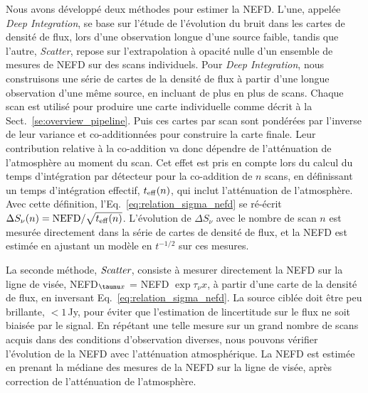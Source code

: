 Nous avons développé deux méthodes pour estimer la NEFD. L'une,
appelée \emph{Deep Integration}, se base sur l'étude de l'évolution du
bruit dans les cartes de densité de flux, lors d'une observation
longue d'une source faible, tandis que l'autre, \emph{Scatter}, repose
sur l'extrapolation à opacité nulle d'un ensemble de mesures de NEFD
sur des scans individuels.
Pour \emph{Deep Integration}, nous construisons une série de cartes de
la densité de flux à partir d'une longue observation d'une même source, en
incluant de plus en plus de scans. Chaque scan est utilisé pour
produire une carte individuelle comme décrit à la
Sect.~\ref{se:overview_pipeline}. Puis ces cartes par scan sont
pondérées par l'inverse de leur variance et co-additionnées pour
construire la carte finale. Leur contribution relative à la
co-addition va donc dépendre de l'atténuation de l'atmosphère au
moment du scan. Cet effet est pris en compte lors du calcul du temps
d'intégration par détecteur pour la co-addition de $n$ scans, en
définissant un temps d'intégration effectif, $t_{\rm{eff}} (n)$, qui
inclut l'atténuation de l'atmosphère. Avec cette définition, 
l'Eq.~\ref{eq:relation_sigma_nefd} se ré-écrit
$\Delta S_\nu (n) = {\rm{NEFD}} / \sqrt{t_{\rm{eff}}(n)}$.
L'évolution de $\Delta S_\nu$ avec le nombre de scan $n$ est mesurée
directement dans la série de cartes de densité de flux, et la NEFD est
estimée en ajustant un modèle en $t^{-1/2}$ sur ces mesures.

La seconde méthode, $\emph{Scatter}$, consiste à mesurer directement
la NEFD sur la ligne de visée, NEFD$_{\taunu x}$ = NEFD $\exp{ \tau_{\nu} x}$, à partir
d'une carte de la densité de flux, en inversant
Eq.~\ref{eq:relation_sigma_nefd}. La source ciblée doit être peu
brillante, $<1\,$Jy, pour éviter que l'estimation de lincertitude sur
le flux ne soit biaisée par le signal. En répétant une telle mesure
sur un grand nombre de scans acquis dans des conditions d'observation
diverses, nous pouvons vérifier l'évolution de la NEFD avec
l'atténuation atmosphérique. La NEFD est estimée en prenant la médiane
des mesures de la NEFD sur la ligne de visée, après correction de
l'atténuation de l'atmosphère.    

